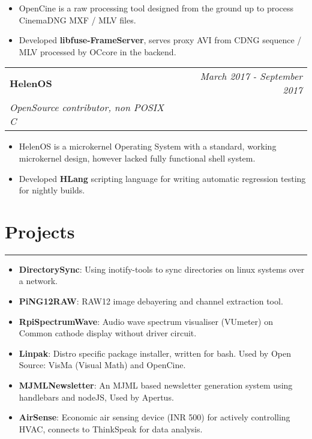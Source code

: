 \documentclass[9pt, a4paper]{article}
\begin{document}
\begin{itemize}
	\itemsep0em
	\item OpenCine is a raw processing tool designed from the ground up to process CinemaDNG MXF / MLV files.
	\item Developed \textbf{libfuse-FrameServer}, serves proxy AVI from CDNG sequence / MLV processed by OCcore in the backend.
\end{itemize}

\vspace{6px}
\hspace{5px}
\begin{tabularx}{\textwidth}{X r}
	\textbf{HelenOS} & \textit{March 2017 - September 2017} \\
	\textit{\small OpenSource contributor, non POSIX C} & \\
\end{tabularx}

\begin{itemize}
	\itemsep0em
	\item HelenOS is a microkernel Operating System with a standard, working microkernel design, however lacked fully functional shell system.
	\item Developed \textbf{HLang} scripting language for writing automatic regression testing for nightly builds.
\end{itemize}

\section*{Projects}
\vspace{-8px}
\hrule
\vspace{4px}
\hspace{5px}
\begin{itemize}
	\item \textbf{DirectorySync}: Using inotify-tools to sync directories on linux systems over a network.
	\item \textbf{PiNG12RAW}: RAW12 image debayering and channel extraction tool.
	\item \textbf{RpiSpectrumWave}: Audio wave spectrum visualiser (VUmeter) on Common cathode display without driver circuit. 
	\item \textbf{Linpak}: Distro specific package installer, written for bash. Used by Open Source: VisMa (Visual Math) and OpenCine.
	\item \textbf{MJMLNewsletter}: An MJML based newsletter generation system using handlebars and nodeJS, Used by Apertus.
	\item \textbf{AirSense}: Economic air sensing device (INR 500) for actively controlling HVAC, connects to ThinkSpeak for data analysis.
\end{itemize}
\end{document}
